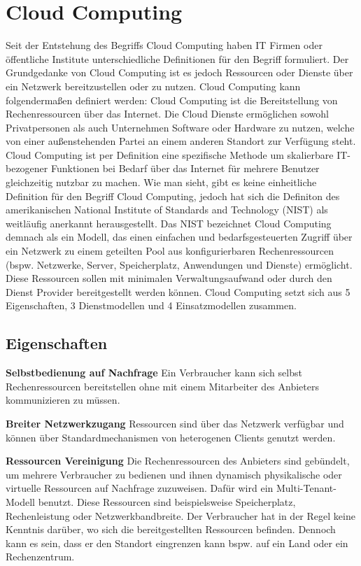 \section{Cloud Computing}
Seit der Entstehung des Begriffs \glqq Cloud Computing\grqq{} haben IT Firmen oder öffentliche Institute unterschiedliche Definitionen für den Begriff formuliert. Der Grundgedanke von Cloud Computing ist es jedoch Ressourcen oder Dienste über ein Netzwerk bereitzustellen oder zu nutzen. Cloud Computing kann folgendermaßen definiert werden: Cloud Computing ist die Bereitstellung von Rechenressourcen über das Internet. Die Cloud Dienste ermöglichen sowohl Privatpersonen als auch Unternehmen Software oder Hardware zu nutzen, welche von einer außenstehenden Partei an einem anderen Standort zur Verfügung steht\cite{canada}. Cloud Computing ist per Definition eine spezifische Methode um skalierbare IT-bezogener Funktionen bei Bedarf über das Internet für mehrere Benutzer gleichzeitig nutzbar zu machen\cite{gartner}.
Wie man sieht, gibt es keine einheitliche Definition für den Begriff \glqq Cloud Computing\grqq, jedoch hat sich die Definiton des amerikanischen National Institute of Standards and Technology (NIST) als weitläufig anerkannt herausgestellt. Das NIST bezeichnet Cloud Computing demnach als ein Modell, das einen einfachen und bedarfsgesteuerten Zugriff über ein Netzwerk zu einem geteilten Pool aus konfigurierbaren Rechenressourcen (bspw. Netzwerke, Server, Speicherplatz, Anwendungen und Dienste) ermöglicht. Diese Ressourcen sollen mit minimalen Verwaltungsaufwand oder durch den Dienst Provider bereitgestellt werden können. Cloud Computing setzt sich aus 5 Eigenschaften, 3 Dienstmodellen und 4 Einsatzmodellen zusammen\cite{nist_definition}.

\subsection{Eigenschaften} 

\textbf{Selbstbedienung auf Nachfrage} \hfill 
Ein Verbraucher kann sich selbst Rechenressourcen bereitstellen ohne mit einem Mitarbeiter des Anbieters kommunizieren zu müssen\cite{nist_definition}.

\textbf{Breiter Netzwerkzugang} \hfill
Ressourcen sind über das Netzwerk verfügbar und können über Standardmechanismen von heterogenen Clients genutzt werden\cite{nist_definition}.

\textbf{Ressourcen Vereinigung} \hfill
Die Rechenressourcen des Anbieters sind gebündelt, um mehrere Verbraucher zu bedienen und ihnen dynamisch physikalische oder virtuelle Ressourcen auf Nachfrage zuzuweisen. Dafür wird ein Multi-Tenant-Modell benutzt. Diese Ressourcen sind beispielsweise Speicherplatz, Rechenleistung oder Netzwerkbandbreite. Der Verbraucher hat in der Regel keine Kenntnis darüber, wo sich die bereitgestellten Ressourcen befinden. Dennoch kann es sein, dass er den Standort eingrenzen kann bspw. auf ein Land oder ein Rechenzentrum\cite{nist_definition}.

